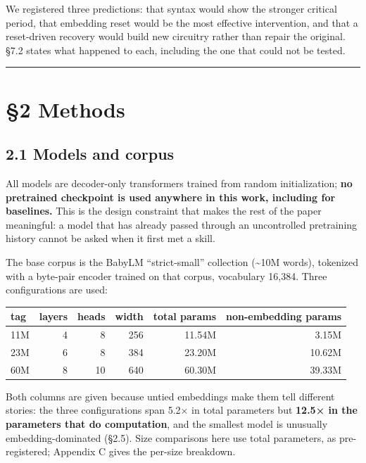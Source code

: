 \documentclass[11pt]{article}
\begin{document}
We registered three predictions: that syntax would show the stronger critical period, that
embedding reset would be the most effective intervention, and that a reset-driven recovery
would build new circuitry rather than repair the original. §7.2 states what happened to
each, including the one that could not be tested.

\begin{center}\rule{0.5\linewidth}{0.5pt}\end{center}

\section{§2 Methods}\label{methods}

\subsection{2.1 Models and corpus}\label{models-and-corpus}

All models are decoder-only transformers trained from random initialization; \textbf{no pretrained
checkpoint is used anywhere in this work, including for baselines.} This is the design
constraint that makes the rest of the paper meaningful: a model that has already passed
through an uncontrolled pretraining history cannot be asked when it first met a skill.

The base corpus is the BabyLM ``strict-small'' collection (\textasciitilde10M words), tokenized with a
byte-pair encoder trained on that corpus, vocabulary 16,384. Three configurations are used:

\begin{table}[t]
\centering\small
\begin{tabular}{@{}lrrrrr@{}}
\toprule\noalign{}
tag & layers & heads & width & total params & non-embedding params \\
\midrule\noalign{}

11M & 4 & 8 & 256 & 11.54M & 3.15M \\
23M & 6 & 8 & 384 & 23.20M & 10.62M \\
60M & 8 & 10 & 640 & 60.30M & 39.33M \\
\bottomrule
\end{tabular}
\end{table}


Both columns are given because untied embeddings make them tell different stories: the three configurations span 5.2× in total parameters but \textbf{12.5× in the parameters that do computation}, and the smallest model is unusually embedding-dominated (§2.5). Size comparisons here use total parameters, as pre-registered; Appendix C gives the per-size breakdown.
\end{document}
